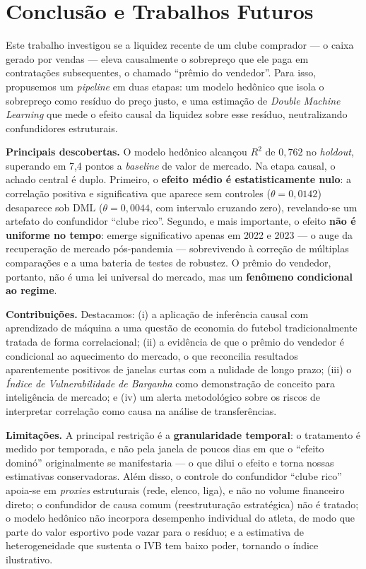 \section{Conclusão e Trabalhos Futuros}

Este trabalho investigou se a liquidez recente de um clube comprador — o caixa gerado por vendas —
eleva causalmente o sobrepreço que ele paga em contratações subsequentes, o chamado ``prêmio do
vendedor''. Para isso, propusemos um \textit{pipeline} em duas etapas: um modelo hedônico que isola
o sobrepreço como resíduo do preço justo, e uma estimação de \textit{Double Machine Learning} que
mede o efeito causal da liquidez sobre esse resíduo, neutralizando confundidores estruturais.

\textbf{Principais descobertas.} O modelo hedônico alcançou $R^2$ de $0{,}762$ no \textit{holdout},
superando em 7,4 pontos a \textit{baseline} de valor de mercado. Na etapa causal, o achado central é
duplo. Primeiro, o \textbf{efeito médio é estatisticamente nulo}: a correlação positiva e
significativa que aparece sem controles ($\theta = 0{,}0142$) desaparece sob DML
($\theta = 0{,}0044$, com intervalo cruzando zero), revelando-se um artefato do confundidor ``clube
rico''. Segundo, e mais importante, o efeito \textbf{não é uniforme no tempo}: emerge significativo
apenas em 2022 e 2023 — o auge da recuperação de mercado pós-pandemia — sobrevivendo à correção de
múltiplas comparações e a uma bateria de testes de robustez. O prêmio do vendedor, portanto, não é
uma lei universal do mercado, mas um \textbf{fenômeno condicional ao regime}.

\textbf{Contribuições.} Destacamos: (i) a aplicação de inferência causal com aprendizado de máquina
a uma questão de economia do futebol tradicionalmente tratada de forma correlacional; (ii) a
evidência de que o prêmio do vendedor é condicional ao aquecimento do mercado, o que reconcilia
resultados aparentemente positivos de janelas curtas com a nulidade de longo prazo; (iii) o
\textit{Índice de Vulnerabilidade de Barganha} como demonstração de conceito para inteligência de
mercado; e (iv) um alerta metodológico sobre os riscos de interpretar correlação como causa na
análise de transferências.

\textbf{Limitações.} A principal restrição é a \textbf{granularidade temporal}: o tratamento é
medido por temporada, e não pela janela de poucos dias em que o ``efeito dominó'' originalmente se
manifestaria — o que dilui o efeito e torna nossas estimativas conservadoras. Além disso, o controle
do confundidor ``clube rico'' apoia-se em \textit{proxies} estruturais (rede, elenco, liga), e não no
volume financeiro direto; o confundidor de causa comum (reestruturação estratégica) não é tratado; o
modelo hedônico não incorpora desempenho individual do atleta, de modo que parte do valor esportivo
pode vazar para o resíduo; e a estimativa de heterogeneidade que sustenta o IVB tem baixo poder,
tornando o índice ilustrativo.

